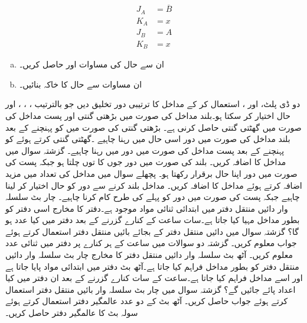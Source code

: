  \begin{align*}
 J_A&=\overline{B}\\
 K_A&=x\\
 J_B&=A\\
 K_B&=x
 \end{align*}
 \begin{enumerate}[a.]
\item
ان سے حال کی مساوات   اور   حاصل کریں۔
\item 
ان  مساوات سے  حال کا خاکہ بنائیں۔
\end{enumerate}
 دو  ڈی پلٹ،  اور ، استعمال کر کے مداخل  کا   ترتیبی دور تخلیق دیں جو بالترتیب  ، ، ،  اور  حال اختیار کر سکتا ہو۔بلند  مداخل  کی صورت میں بڑھتی  گنتی   اور پست مداخل  کی صورت میں گھٹتی گنتی  حاصل کرنی ہے۔ بڑھتی گنتی کی صورت میں  کو  پہنچنے کے بعد بلند  مداخل  کی صورت میں  دور اسی حال میں رہنا چاہیے ۔گھٹتی گنتی کرتے ہوئے  کو پہنچنے کے بعد پست مداخل کی صورت میں دور  میں رہنا چاہیے۔
 گزشتہ سوال میں  مداخل   کا اضافہ کریں۔ بلند   کی صورت میں دور جوں کا توں چلتا ہو جبکہ پست  کی صورت میں  دور اپنا حال برقرار رکھتا ہو۔
 پچھلے سوال   میں  مداخل کی تعداد میں مزید اضافہ کرتے ہوئے مداخل   کا اضافہ کریں۔ مداخل   بلند کرنے سے دور کو حال  اختیار کر لینا چاہیے جبکہ پست   کی صورت میں دور  کو  پہلے کی طرح کام کرنا چاہیے۔
 چار بٹ  سلسلہ وار دائیں منتقل دفتر میں ابتدائی ثنائی مواد   موجود ہے۔دفتر کا مخارج  اسی دفتر کو بطور مداخل مہیا کیا جاتا ہے۔سات ساعت کے کنارے گزرنے کے بعد دفتر میں کیا عدد ہو گا؟
  گزشتہ سوال میں دائیں منتقل دفتر کے بجائے بائیں منتقل دفتر استعمال کرتے ہوئے  جواب معلوم کریں۔
 گزشتہ دو سوالات میں  ساعت  کے ہر کنارے پر دفتر میں ثنائی عدد  معلوم  کریں۔
 آٹھ بٹ  سلسلہ وار دائیں منتقل دفتر کا  مخارج  چار بٹ  سلسلہ وار دائیں منتقل دفتر  کو بطور مداخل فراہم کیا جاتا ہے۔آٹھ بٹ دفتر میں ابتدائی مواد  پایا جاتا ہے  اور  اسے    مداخل  فراہم کیا جاتا ہے۔ساعت کے سات کنارے گزرنے کے بعد ان دفتر  میں کیا اعداد پائے جائیں گے؟
 گزشتہ سوال میں چار بٹ سلسلہ وار بائیں منتقل دفتر استعمال کرتے  ہوئے جواب حاصل کریں۔
 آٹھ بٹ کے دو عدد عالمگیر دفتر استعمال کرتے ہوئے سولہ بٹ کا عالمگیر دفتر حاصل کریں۔
